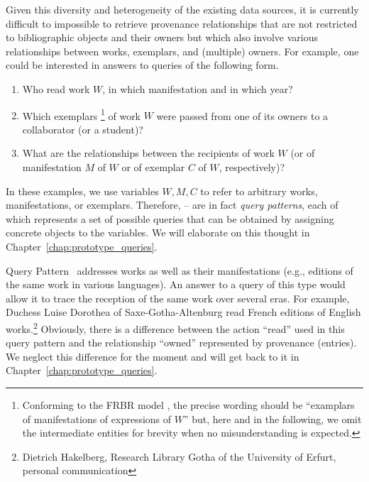 Given this diversity and heterogeneity of the existing data sources,
it is currently difficult to impossible to retrieve provenance relationships
that are not restricted to bibliographic objects and their owners
but which also involve various relationships between works, exemplars, and (multiple) owners.
For example, one could be interested in answers to queries of the following form.
%
\begin{enumerate}
  \item[\exaquery{1}]
    Who read %
    work $W$, in which manifestation and in which year?
  \item[\exaquery{2}]
    Which exemplars%
    \footnote{%
      Conforming to the FRBR model \autocite{FRBR1998},
      the precise wording should be \enquote{examplars of manifestations of expressions of $W$}
      but, here and in the following,
      we omit the intermediate entities for brevity when no misunderstanding is expected.%
    }
    of work $W$
    were passed from one of its owners to a collaborator (or a student)?
  \item[\exaquery{3}]
    What are the relationships between the recipients of work $W$
    (or of manifestation $M$ of $W$ or of exemplar $C$ of $W$, respectively)?
\end{enumerate}
%
In these examples, we use variables $W,M,C$ to refer to arbitrary works,
manifestations, or exemplars. Therefore, -- are in fact
\emph{query patterns}, each of which represents a set of possible queries
that can be obtained by assigning concrete objects to the variables.
We will elaborate on this thought in Chapter~\ref{chap:prototype_queries}.

Query Pattern~ addresses works as well as their manifestations
(e.g., editions of the same work in various languages).
An answer to a query of this type would allow it to trace the reception
of the same work over several eras. For example, Duchess Luise Dorothea of Saxe-Gotha-Altenburg
read French editions of English works.\footnote{Dietrich Hakelberg, Research Library Gotha of the University of Erfurt, personal communication}
Obviously, there is a difference between the action \enquote{read}
used in this query pattern and the relationship \enquote{owned} represented by
provenance (entries). We neglect this difference for the moment
and will get back to it in Chapter~\ref{chap:prototype_queries}.

